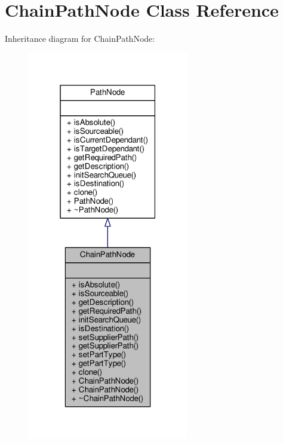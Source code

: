 \hypertarget{classChainPathNode}{}\section{Chain\+Path\+Node Class Reference}
\label{classChainPathNode}


Inheritance diagram for Chain\+Path\+Node\+:
\nopagebreak
\begin{figure}[H]
\begin{center}
\leavevmode
\includegraphics[width=199pt]{d3/d64/classChainPathNode__inherit__graph}
\end{center}
\end{figure}


